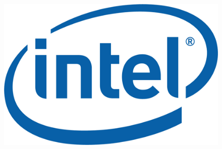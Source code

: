 \documentclass[letterpaper]{jm-cv} %
\begin{document}
\begin{figure}
  \includegraphics[scale=0.12]{logo-intel.png}
\end{figure}
\end{document}
